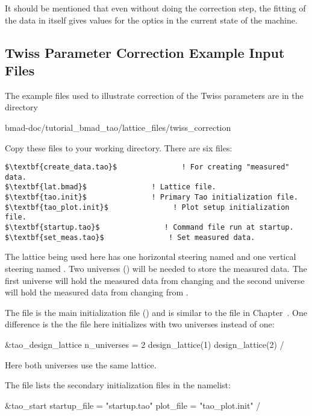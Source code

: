 \documentclass{hitec}     %
\begin{document}
{It should be mentioned that even without doing the correction step, the fitting of the data in 
itself gives values for the optics in the current state of the machine.

\subsection{Twiss Parameter Correction Example Input Files}
\label{s:twiss.setup}

The example files used to illustrate correction of the Twiss parameters are in the directory 
\begin{code}
bmad-doc/tutorial_bmad_tao/lattice_files/twiss_correction
\end{code}
Copy these files to your working directory. There are six files:
\begin{lstlisting}[mathescape]
$\textbf{create_data.tao}$               ! For creating "measured" data. 
$\textbf{lat.bmad}$               ! Lattice file.
$\textbf{tao.init}$               ! Primary Tao initialization file.
$\textbf{tao_plot.init}$               ! Plot setup initialization file.
$\textbf{startup.tao}$               ! Command file run at startup.
$\textbf{set_meas.tao}$               ! Set measured data.
\end{lstlisting}

The lattice being used here has one horizontal steering named  and one vertical steering
named . Two universes () will be needed to store the measured
data. The first universe will hold the measured data from changing  and the second universe
will hold the measured data from changing from .

The file  is the main initialization file () and is similar to the
 file in Chapter~. One difference is the the  file here
initializes \tao with two universes instead of one:
\begin{code}
&tao_design_lattice
  n_universes = 2
  design_lattice(1)%
  design_lattice(2)%
/
\end{code}
Here both universes use the same lattice.

The  file lists the secondary initialization files in the  namelist:
\begin{code}
&tao_start
  startup_file = "startup.tao"
  plot_file = "tao_plot.init"
/
\end{code}

}
\end{document}
